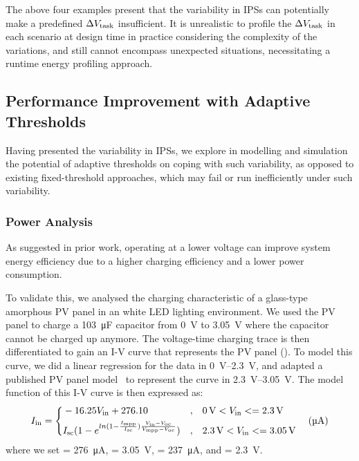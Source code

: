 The above four examples present that the variability in IPSs can potentially make a predefined $\Delta V_{\text{task}}$ insufficient. 
It is unrealistic to profile the $\Delta V_{\text{task}}$ in each scenario at design time in practice considering the complexity of the variations, and still cannot encompass unexpected situations, necessitating a runtime energy profiling approach. 


\subsection{Performance Improvement with Adaptive Thresholds}

Having presented the variability in IPSs, we explore in modelling and simulation the potential of adaptive thresholds on coping with such variability, as opposed to existing fixed-threshold approaches, which may fail or run inefficiently under such variability.


\subsubsection{Power Analysis}

As suggested in prior work, operating at a lower voltage can improve system energy efficiency due to a higher charging efficiency and a lower power consumption.

To validate this, we analysed the charging characteristic of a glass-type amorphous PV panel in an white LED lighting environment. 
We used the PV panel to charge a \SI{103}{\micro\farad} capacitor from \SI{0}{\volt} to \SI{3.05}{\volt} where the capacitor cannot be charged up anymore. 
The voltage-time charging trace is then differentiated to gain an I-V curve that represents the PV panel (). 
To model this curve, we did a linear regression for the data in \SIrange{0}{2.3}{\volt}, and adapted a published PV panel model~\cite{en9050326} to represent the curve in \SIrange{2.3}{3.05}{\volt}.
The model function of this I-V curve is then expressed as:
\begin{equation}
    I_{\text{in}} = \left\{
    \begin{aligned}
        & -16.25 V_{\text{in}} + 276.10 & , & \quad \SI{0}{\volt} < V_{\text{in}} <= \SI{2.3}{\volt} \\
        & I_{\text{sc}} (1 - e ^ {ln(1 - \frac{I_{\text{mpp}}}{I_{\text{sc}}}) \frac{V_{\text{in}} - V_{\text{oc}}}{V_{\text{mpp}} - V_{\text{oc}}}}) & , & \quad \SI{2.3}{\volt} < V_{\text{in}} <= \SI{3.05}{\volt}
    \end{aligned}
    \right. 
    \quad (\SI{}{\micro\ampere})
    \label{eq:pv_iv}
\end{equation}
where we set  = \SI{276}{\micro\ampere},  = \SI{3.05}{\volt},  = \SI{237}{\micro\ampere}, and  = \SI{2.3}{\volt}.


